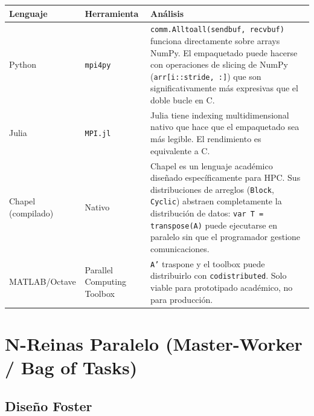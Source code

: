 \documentclass[12pt,a4paper]{article}
\begin{document}
\begin{longtable}{L{2.5cm} L{3.5cm} L{7.5cm}}
\toprule
\textbf{Lenguaje} & \textbf{Herramienta} & \textbf{Análisis} \\
\midrule
\endhead
Python & \texttt{mpi4py} & \texttt{comm.Alltoall(sendbuf, recvbuf)} funciona directamente
  sobre arrays NumPy. El empaquetado puede hacerse con operaciones de slicing
  de NumPy (\texttt{arr[i::stride, :]}) que son significativamente más
  expresivas que el doble bucle en C. \\[4pt]
Julia & \texttt{MPI.jl} & Julia tiene indexing multidimensional nativo que hace que
  el empaquetado sea más legible. El rendimiento es equivalente a C. \\[4pt]
Chapel (compilado) & Nativo & Chapel es un lenguaje académico diseñado específicamente
  para HPC. Sus distribuciones de arreglos (\texttt{Block}, \texttt{Cyclic})
  abstraen completamente la distribución de datos: \texttt{var T = transpose(A)}
  puede ejecutarse en paralelo sin que el programador gestione comunicaciones. \\[4pt]
MATLAB/Octave & Parallel Computing Toolbox & \texttt{A'} traspone y el toolbox
  puede distribuirlo con \texttt{codistributed}. Solo viable para prototipado
  académico, no para producción. \\
\bottomrule
\end{longtable}

\newpage

\section{N-Reinas Paralelo (Master-Worker / Bag of Tasks)}

\subsection{Diseño Foster}
\end{document}
